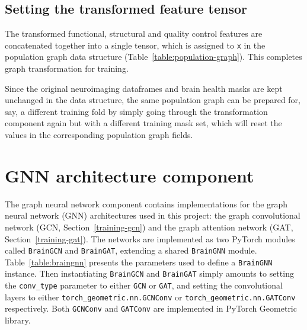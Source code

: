 \subsection{Setting the transformed feature tensor}
The transformed functional, structural and quality control features are concatenated together into a single tensor, which is assigned to \texttt{x} in the population graph data structure (Table~\ref{table:population-graph}). This completes graph transformation for training.

Since the original neuroimaging dataframes and brain health masks are kept unchanged in the data structure, the same population graph can be prepared for, say, a different training fold by simply going through the transformation component again but with a different training mask set, which will reset the values in the corresponding population graph fields.

\section{GNN architecture component}
\label{section:gnn-architecture}

The graph neural network component contains implementations for the graph neural network (GNN) architectures used in this project: the graph convolutional network (GCN, Section~\ref{training-gcn}) and the graph attention network (GAT, Section~\ref{training-gat}). The networks are implemented as two PyTorch modules called \texttt{BrainGCN} and \texttt{BrainGAT}, extending a shared \texttt{BrainGNN} module. Table~\ref{table:braingnn} presents the parameters used to define a \texttt{BrainGNN} instance. Then instantiating \texttt{BrainGCN} and \texttt{BrainGAT} simply amounts to setting the \texttt{conv\_type} parameter to either \texttt{GCN} or \texttt{GAT}, and setting the convolutional layers to either \texttt{torch\_geometric.nn.GCNConv} or \texttt{torch\_geometric.nn.GATConv} respectively. Both \texttt{GCNConv} and \texttt{GATConv} are implemented in PyTorch Geometric library.


